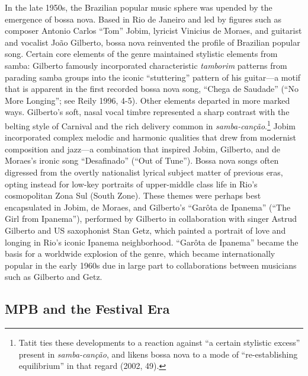 \documentclass[twoside]{article}
\begin{document}
In the late 1950s, the Brazilian popular music sphere was upended by the
emergence of bossa nova. Based in Rio de Janeiro and led by figures such
as composer Antonio Carlos ``Tom'' Jobim, lyricist Vinicius de Moraes,
and guitarist and vocalist João Gilberto, bossa nova reinvented the
profile of Brazilian popular song. Certain core elements of the genre
maintained stylistic elements from samba: Gilberto famously incorporated
characteristic \emph{tamborim} patterns from parading samba groups into
the iconic ``stuttering'' pattern of his guitar---a motif that is
apparent in the first recorded bossa nova song, ``Chega de Saudade''
(``No More Longing''; see Reily 1996, 4-5). Other elements departed in
more marked ways. Gilberto's soft, nasal vocal timbre represented a
sharp contrast with the belting style of Carnival and the rich delivery
common in \emph{samba-canção}.\footnote{Tatit ties these developments to
  a reaction against ``a certain stylistic excess'' present in
  \emph{samba-canção}, and likens bossa nova to a mode of
  ``re-establishing equilibrium'' in that regard (2002, 49).} Jobim
incorporated complex melodic and harmonic qualities that drew from
modernist composition and jazz---a combination that inspired Jobim,
Gilberto, and de Moraes's ironic song ``Desafinado'' (``Out of Tune'').
Bossa nova songs often digressed from the overtly nationalist lyrical
subject matter of previous eras, opting instead for low-key portraits of
upper-middle class life in Rio's cosmopolitan Zona Sul (South Zone).
These themes were perhaps best encapsulated in Jobim, de Moraes, and
Gilberto's ``Garôta de Ipanema'' (``The Girl from Ipanema''), performed
by Gilberto in collaboration with singer Astrud Gilberto and US
saxophonist Stan Getz, which painted a portrait of love and longing in
Rio's iconic Ipanema neighborhood. ``Garôta de Ipanema'' became the
basis for a worldwide explosion of the genre, which became
internationally popular in the early 1960s due in large part to
collaborations between musicians such as Gilberto and Getz.

\hypertarget{mpb-and-the-festival-era}{%
\subsection*{MPB and the Festival Era}\label{mpb-and-the-festival-era}}
\end{document}
